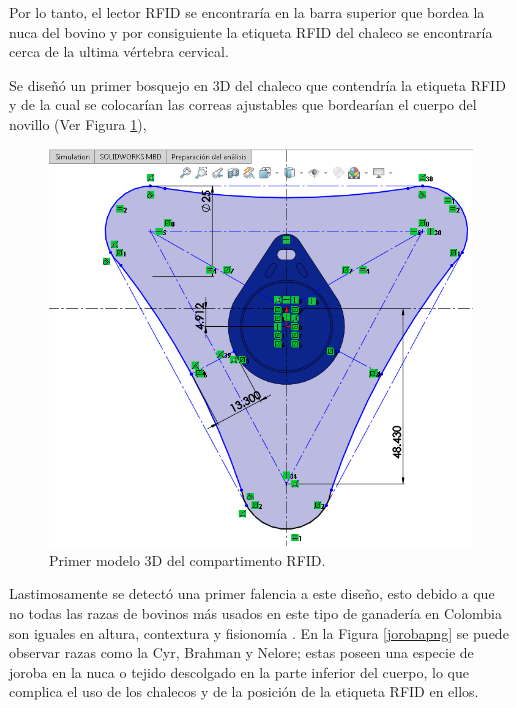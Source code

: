 Por lo tanto, el lector RFID se encontraría en la barra superior que bordea la nuca del bovino y por consiguiente la etiqueta RFID del chaleco se encontraría cerca de la ultima vértebra cervical.

Se diseñó un primer bosquejo en 3D del chaleco que contendría la etiqueta RFID y de la cual se colocarían las correas ajustables que bordearían el cuerpo del novillo (Ver Figura \ref{mod1png}),  

		\begin{figure}[H]
		\begin{center}
			\includegraphics[scale=0.45]{img/primermodel.png}
		\end{center}
		\caption{Primer modelo 3D del compartimento RFID. \label{mod1png}}
		\end{figure}

Lastimosamente se detectó una primer falencia a este diseño, esto debido a que no todas las razas de bovinos más usados en este tipo de ganadería en Colombia son iguales en altura, contextura y fisionomía \cite{razas}. En la Figura \ref{jorobapng} se puede observar razas como la Cyr, Brahman y Nelore; estas poseen una especie de joroba en la nuca o tejido descolgado en la parte inferior del cuerpo, lo que complica el uso de los chalecos y de la posición de la etiqueta RFID en ellos.

